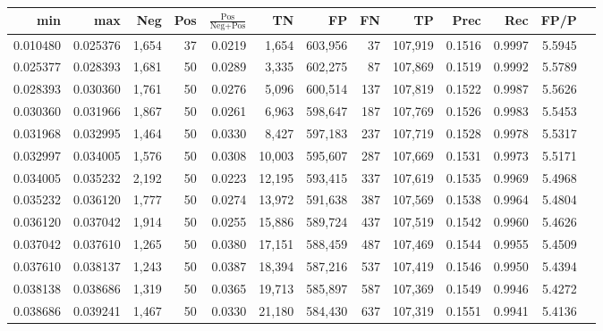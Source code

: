 \begin{tabular}{rrrrrrrrrrrrr}
\toprule
     min &      max &   Neg & Pos & $\frac{\text{Pos}}{\text{Neg}+\text{Pos}}$ &      TN &      FP &      FN &      TP &   Prec &    Rec &   FP/P \\
\midrule
0.010480 & 0.025376 & 1,654 &  37 &                                     0.0219 &   1,654 & 603,956 &      37 & 107,919 & 0.1516 & 0.9997 & 5.5945 \\
0.025377 & 0.028393 & 1,681 &  50 &                                     0.0289 &   3,335 & 602,275 &      87 & 107,869 & 0.1519 & 0.9992 & 5.5789 \\
0.028393 & 0.030360 & 1,761 &  50 &                                     0.0276 &   5,096 & 600,514 &     137 & 107,819 & 0.1522 & 0.9987 & 5.5626 \\
0.030360 & 0.031966 & 1,867 &  50 &                                     0.0261 &   6,963 & 598,647 &     187 & 107,769 & 0.1526 & 0.9983 & 5.5453 \\
0.031968 & 0.032995 & 1,464 &  50 &                                     0.0330 &   8,427 & 597,183 &     237 & 107,719 & 0.1528 & 0.9978 & 5.5317 \\
0.032997 & 0.034005 & 1,576 &  50 &                                     0.0308 &  10,003 & 595,607 &     287 & 107,669 & 0.1531 & 0.9973 & 5.5171 \\
0.034005 & 0.035232 & 2,192 &  50 &                                     0.0223 &  12,195 & 593,415 &     337 & 107,619 & 0.1535 & 0.9969 & 5.4968 \\
0.035232 & 0.036120 & 1,777 &  50 &                                     0.0274 &  13,972 & 591,638 &     387 & 107,569 & 0.1538 & 0.9964 & 5.4804 \\
0.036120 & 0.037042 & 1,914 &  50 &                                     0.0255 &  15,886 & 589,724 &     437 & 107,519 & 0.1542 & 0.9960 & 5.4626 \\
0.037042 & 0.037610 & 1,265 &  50 &                                     0.0380 &  17,151 & 588,459 &     487 & 107,469 & 0.1544 & 0.9955 & 5.4509 \\
0.037610 & 0.038137 & 1,243 &  50 &                                     0.0387 &  18,394 & 587,216 &     537 & 107,419 & 0.1546 & 0.9950 & 5.4394 \\
0.038138 & 0.038686 & 1,319 &  50 &                                     0.0365 &  19,713 & 585,897 &     587 & 107,369 & 0.1549 & 0.9946 & 5.4272 \\
0.038686 & 0.039241 & 1,467 &  50 &                                     0.0330 &  21,180 & 584,430 &     637 & 107,319 & 0.1551 & 0.9941 & 5.4136 \\

\end{tabular}
